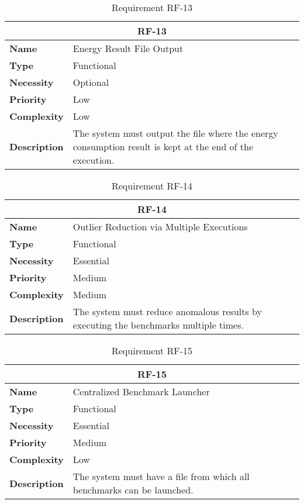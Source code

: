 \begin{table}[H]
    \centering
    \begin{tabular}{l p{10cm}}
        \toprule
        \multicolumn{2}{c}{\textbf{RF-13}} \\
        \toprule
        \textbf{Name}               & Energy Result File Output \\
        \textbf{Type}               & Functional \\
        \textbf{Necessity}          & Optional \\
        \textbf{Priority}           & Low \\
        \textbf{Complexity}         & Low \\
        \textbf{Description}        & The system must output the file where the energy consumption result is kept at the end of the execution. \\
        \bottomrule
    \end{tabular}
\caption{Requirement RF-13}\label{tab:rf-13}
\end{table}

\begin{table}[H]
    \centering
    \begin{tabular}{l p{10cm}}
        \toprule
        \multicolumn{2}{c}{\textbf{RF-14}} \\
        \toprule
        \textbf{Name}               & Outlier Reduction via Multiple Executions \\
        \textbf{Type}               & Functional \\
        \textbf{Necessity}          & Essential \\
        \textbf{Priority}           & Medium \\
        \textbf{Complexity}         & Medium \\
        \textbf{Description}        & The system must reduce anomalous results by executing the benchmarks multiple times. \\
        \bottomrule
    \end{tabular}
\caption{Requirement RF-14}\label{tab:rf-14}
\end{table}

\begin{table}[H]
    \centering
    \begin{tabular}{l p{10cm}}
        \toprule
        \multicolumn{2}{c}{\textbf{RF-15}} \\
        \toprule
        \textbf{Name}               & Centralized Benchmark Launcher \\
        \textbf{Type}               & Functional \\
        \textbf{Necessity}          & Essential \\
        \textbf{Priority}           & Medium \\
        \textbf{Complexity}         & Low \\
        \textbf{Description}        & The system must have a file from which all benchmarks can be launched. \\
        \bottomrule
    \end{tabular}
\caption{Requirement RF-15}\label{tab:rf-15}
\end{table}

